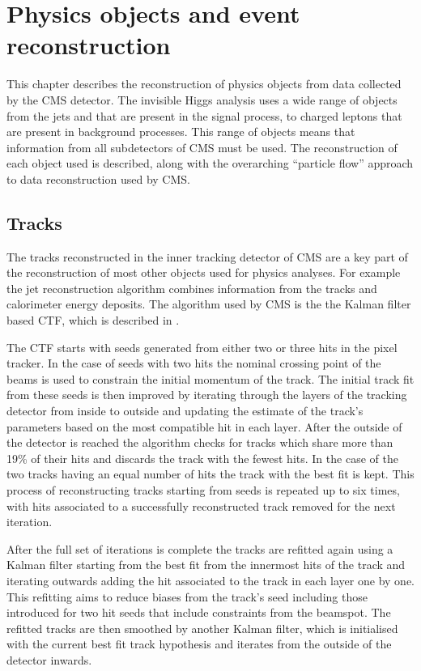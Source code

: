 \chapter{Physics objects and event reconstruction}
\label{chap:obj}
This chapter describes the reconstruction of physics objects from data collected by the CMS detector. The invisible Higgs analysis uses a wide range of objects from the jets and \MET that are present in the signal process, to charged leptons that are present in background processes. This range of objects means that information from all subdetectors of CMS must be used. The reconstruction of each object used is described, along with the overarching ``particle flow'' approach to data reconstruction used by CMS.

\section{Tracks}
\label{sec:tracks}
The tracks reconstructed in the inner tracking detector of CMS are a key part of the reconstruction of most other objects used for physics analyses. For example the jet reconstruction algorithm combines information from the tracks and calorimeter energy deposits. The algorithm used by CMS is the the Kalman filter based \ac{CTF}, which is described in  \cite{1748-0221-9-10-P10009}. 

The \ac{CTF} starts with seeds generated from either two or three hits in the pixel tracker. In the case of seeds with two hits the nominal crossing point of the beams is used to constrain the initial momentum of the track. The initial track fit from these seeds is then improved by iterating through the layers of the tracking detector from inside to outside and updating the estimate of the track's parameters based on the most compatible hit in each layer. After the outside of the detector is reached the algorithm checks for tracks which share more than 19\% of their hits and discards the track with the fewest hits. In the case of the two tracks having an equal number of hits the track with the best fit is kept. This process of reconstructing tracks starting from seeds is repeated up to six times, with hits associated to a successfully reconstructed track removed for the next iteration. 

After the full set of iterations is complete the tracks are refitted again using a Kalman filter starting from the best fit from the innermost hits of the track and iterating outwards adding the hit associated to the track in each layer one by one. This refitting aims to reduce biases from the track's seed including those introduced for two hit seeds that include constraints from the beamspot. The refitted tracks are then smoothed by another Kalman filter, which is initialised with the current best fit track hypothesis and iterates from the outside of the detector inwards. 

